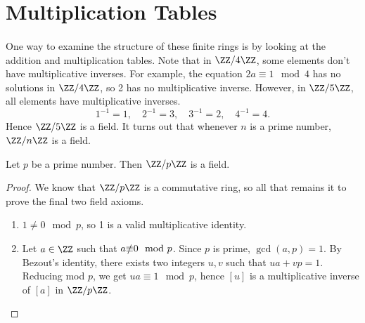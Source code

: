 \documentclass[../abstract_algebra.tex]{subfiles}
\begin{document}
    \section{Multiplication Tables}
        \paragraph{}
        One way to examine the structure of these finite rings is by looking at the addition and multiplication tables.
        Note that in $\ZZ/4\ZZ$, some elements don't have multiplicative inverses.
        For example, the equation $2a\equiv 1\mod4$ has no solutions in $\ZZ/4\ZZ$, so 2 has no multiplicative inverse.
        However, in $\ZZ/5\ZZ$, all elements have multiplicative inverses.
        \begin{equation}
            1^{-1}=1,\quad 2^{-1}=3,\quad 3^{-1}=2,\quad 4^{-1}=4.
        \end{equation}
        Hence $\ZZ/5\ZZ$ is a field.
        It turns out that whenever $n$ is a prime number, $\ZZ/n\ZZ$ is a field.
        \begin{theorem}
            Let $p$ be a prime number. Then $\ZZ/p\ZZ$ is a field.
        \end{theorem}
        \begin{proof}
            We know that $\ZZ/p\ZZ$ is a commutative ring, so all that remains it to prove the final two field axioms.
            \begin{enumerate}[label={\upshape(\roman*)}]
                \item $1\neq0\mod p$, so 1 is a valid multiplicative identity.
                \item Let $a\in\ZZ$ such that $a\slashed\equiv0\mod p$. Since $p$ is prime, $\gcd(a,p)=1$.
                By Bezout's identity, there exists two integers $u,v$ such that $ua+vp=1$.
                Reducing mod $p$, we get $ua\equiv 1\mod p$, hence $[u]$ is a multiplicative inverse of $[a]$ in $\ZZ/p\ZZ$. 
            \end{enumerate}
        \end{proof}
\end{document}
